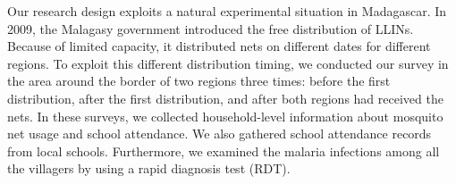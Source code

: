 \documentclass[fleqn,11pt]{article}
\begin{document}







Our research design exploits a natural experimental situation in Madagascar. In 2009, the Malagasy government introduced the free distribution of LLINs. Because of limited capacity, it distributed nets on different dates for different regions. To exploit this different distribution timing, we conducted our survey in the area around the border of two regions three times: before the first distribution, after the first distribution, and after both regions had received the nets. In these surveys, we collected household-level information about mosquito net usage and school attendance. We also gathered school attendance records from local schools. Furthermore, we examined the malaria infections among all the villagers by using a rapid diagnosis test (RDT).
\end{document}
